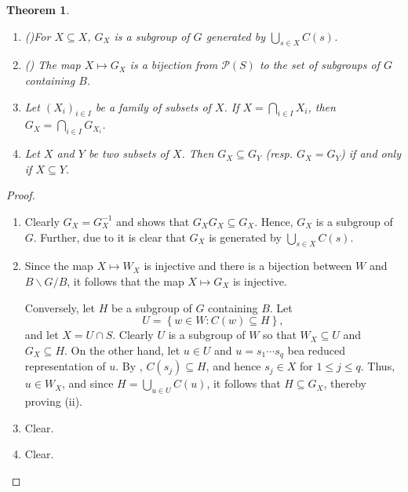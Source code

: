 \documentclass{article}
\theoremstyle{thmstyle}
\newtheorem{theorem}{Theorem}[section]
\theoremstyle{defstyle}
\newcommand{\scrP}{\mathscr{P}}
\renewcommand{\le}{\leqslant}
\begin{document}
\begin{theorem}
\begin{enumerate}[label=(\roman*)]
    \item \big(\cite[2.3.2]{macdonald-spherical-functions}\big)For $X\subseteq X$, $G_X$ is a subgroup of $G$ generated by $\bigcup_{s\in X} C(s)$.
    \item \big(\cite[2.3.3]{macdonald-spherical-functions}\big) The map $X\mapsto G_X$ is a bijection from $\scrP(S)$ to the set of subgroups of $G$ containing $B$.
    \item Let $(X_i)_{i\in I}$ be a family of subsets of $X$. If $X = \bigcap_{i\in I} X_i$, then $G_X = \bigcap_{i\in I} G_{X_i}$.
    \item Let $X$ and $Y$ be two subsets of $X$. Then $G_X\subseteq G_Y$ (resp. $G_X = G_Y$) if and only if $X\subseteq Y$.
\end{enumerate}
\end{theorem}
\begin{proof}
\begin{enumerate}[label=(\roman*)]
    \item Clearly $G_X = G_X^{-1}$ and  shows that $G_X G_X\subseteq G_X$. Hence, $G_X$ is a subgroup of $G$. Further, due to  it is clear that $G_X$ is generated by $\bigcup_{s\in X} C(s)$.

    \item Since the map $X\mapsto W_X$ is injective and there is a bijection between $W$ and $B\backslash G/B$, it follows that the map $X\mapsto G_X$ is injective. 

    Conversely, let $H$ be a subgroup of $G$ containing $B$. Let 
    \begin{equation*}
        U = \left\{w\in W\colon C(w)\subseteq H\right\},
    \end{equation*}
    and let $X = U\cap S$. Clearly $U$ is a subgroup of $W$ so that $W_X\subseteq U$ and $G_X\subseteq H$. On the other hand, let $u\in U$ and $u = s_1\cdots s_q$ bea reduced representation of $u$. By , $C(s_j)\subseteq H$, and hence $s_j\in X$ for $1\le j\le q$. Thus, $u\in W_X$, and since $H = \bigcup_{u\in U} C(u)$, it follows that $H\subseteq G_X$, thereby proving (ii).

    \item Clear.
    \item Clear. \qedhere
\end{enumerate}
\end{proof}
\end{document}
